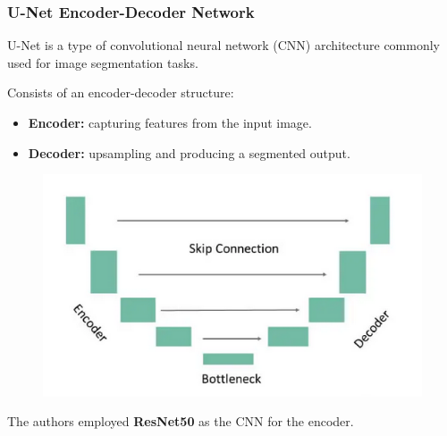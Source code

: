 \documentclass[13.5pt,aspecratio=169, xcolor=dvipsnames]{beamer}
\begin{document}
\begin{frame}
    \onehalfspacing
        \frametitle{U-Net Encoder-Decoder Network}
        U-Net is a type of convolutional neural network (CNN) architecture commonly used for image segmentation tasks.
        \begin{minipage}{0.55\textwidth}
            \begin{minipage}{0.95\textwidth}
            \begin{block}{Consists of an encoder-decoder structure:}
                \begin{itemize}
                    \item \textbf{Encoder:} capturing features from the input image. 
                    \item \textbf{Decoder:} upsampling and producing a segmented output.
                \end{itemize}
            \end{block}
        \end{minipage}
        \end{minipage}
        \begin{minipage}{0.35\textwidth}
            \begin{figure}[h]
                \centering
                \hspace{10em}
                \includegraphics[scale=0.4]{U_net.png}
            \end{figure}
        \end{minipage}

        \vspace{2em}
        The authors employed \textbf{ResNet50} as the CNN for the encoder.
\end{frame}
\end{document}
